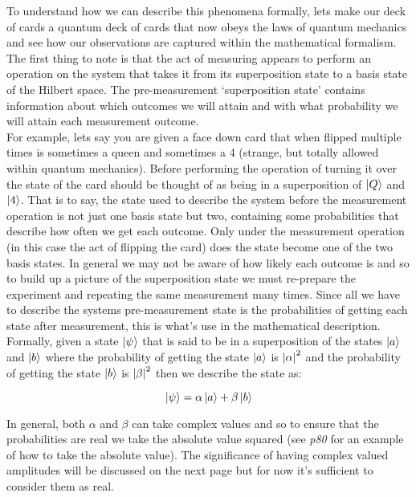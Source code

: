 To understand how we can describe this phenomena formally, lets make our deck of cards a quantum deck of cards that now obeys the laws of quantum mechanics and see how our observations are captured within the mathematical formalism.\\

The first thing to note is that the act of measuring appears to perform an operation on the system that takes it from its superposition state to a basis state of the Hilbert space. The pre-measurement `superposition state' contains information about which outcomes we will attain and with what probability we will attain each measurement outcome.\\

For example, lets say you are given a face down card that when flipped multiple times is sometimes a queen and sometimes a 4 (strange, but totally allowed within quantum mechanics). Before performing the operation of turning it over the state of the card should be thought of as being in a superposition of $\left\vert{Q}\right\rangle$ and $\left\vert{4}\right\rangle$. That is to say, the state used to describe the system before the measurement operation is not just one basis state but two, containing some probabilities that describe how often we get each outcome. Only under the measurement operation (in this case the act of flipping the card) does the state become one of the two basis states. In general we may not be aware of how likely each outcome is and so to build up a picture of the superposition state we must re-prepare the experiment and repeating the same measurement many times. Since all we have to describe the systems pre-measurement state is the probabilities of getting each state after measurement, this is what's use in the mathematical description.\\

Formally, given a state $\left\vert{\psi}\right\rangle$ that is said to be in a superposition of the states $\left\vert{a}\right\rangle$ and $\left\vert{b}\right\rangle$ where the probability of getting the state $\left\vert{a}\right\rangle$ is $\abs{\alpha}^{2}$ and the probability of getting the state $\left\vert{b}\right\rangle$ is $\abs{\beta}^{2}$ then we describe the state as:

\begin{equation}
\left\vert{\psi}\right\rangle = \alpha \left\vert{a}\right\rangle + \beta \left\vert{b}\right\rangle
\end{equation}

In general, both $\alpha$ and $\beta$ can take complex values and so to ensure that the probabilities are real we take the absolute value squared (see \cite{nielsen_chuang_2010} \textit{p80} for an example of how to take the absolute value). The significance of having complex valued amplitudes will be discussed on the next page but for now it's sufficient to consider them as real.\\


